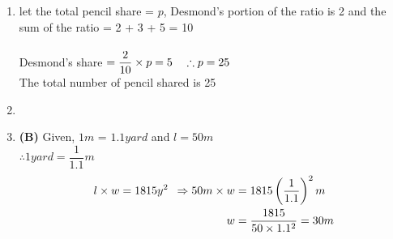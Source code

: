 \begin{multicols}{2}
\begin{enumerate}[label={\textbf{\arabic*.}}]
\begin{enumerate}[label={\arabic*.}]
    \item let the total pencil share = $p$, Desmond's portion of the ratio is 2 and the sum of the ratio = 2 + 3 + 5 = 10 \\\\
    Desmond's share $ = \dfrac{2}{10} \times p = 5 \hspace{10px} \therefore p = 25$ \\
    The total number of pencil shared is 25
    \item 
    \item \textbf{(B)} Given, $1m$ = $1.1yard$ and $ l = 50m $  \\
    $\therefore 1 yard = \dfrac{1}{1.1}m $
    \begin{align*}
         l \times w = 1815y^2 \hspace{5px} \Rightarrow
         50m \times w &= 1815\left(\dfrac{1}{1.1}\right)^2m \\
         w &= \dfrac{1815}{50 \times 1.1^2} = 30m 
    \end{align*}


\end{enumerate}
\end{enumerate}
\end{multicols}
